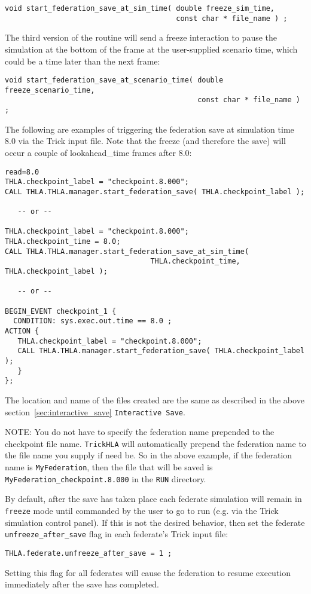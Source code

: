 \begin{verbatim}
void start_federation_save_at_sim_time( double freeze_sim_time,
                                        const char * file_name ) ;
\end{verbatim}

The third version of the routine will send a freeze interaction to pause the
simulation at the bottom of the frame at the user-supplied scenario time,
which could be a time later than the next frame:

\begin{verbatim}
void start_federation_save_at_scenario_time( double freeze_scenario_time,
                                             const char * file_name ) ;
\end{verbatim}

The following are examples of triggering the federation
save at simulation time 8.0 via the Trick input file. Note that the freeze (and therefore
the save) will occur a couple of lookahead\_time frames after 8.0:

\begin{verbatim}
read=8.0
THLA.checkpoint_label = "checkpoint.8.000";
CALL THLA.THLA.manager.start_federation_save( THLA.checkpoint_label );

   -- or --

THLA.checkpoint_label = "checkpoint.8.000";
THLA.checkpoint_time = 8.0;
CALL THLA.THLA.manager.start_federation_save_at_sim_time( 
                                  THLA.checkpoint_time, THLA.checkpoint_label );

   -- or --

BEGIN_EVENT checkpoint_1 {
  CONDITION: sys.exec.out.time == 8.0 ;
ACTION {
   THLA.checkpoint_label = "checkpoint.8.000";
   CALL THLA.THLA.manager.start_federation_save( THLA.checkpoint_label );
   }
};
\end{verbatim}

The location and name of the files created are the same as described in the above section~\ref{sec:interactive_save}
 {\tt Interactive Save}.

NOTE: You do not have to specify the federation name prepended to the checkpoint file name.
{\tt TrickHLA} will automatically prepend the federation name to the file name you supply if need be.
So in the above example, if the federation 
name is {\tt MyFederation}, then the file that will be saved is {\tt MyFederation\_checkpoint.8.000} in the {\tt RUN} directory.

By default, after the save has taken place each federate simulation will remain in {\tt freeze} mode until commanded
by the user to go to run (e.g. via the Trick simulation control panel). If this is not the desired behavior, then set the federate {\tt unfreeze\_after\_save} flag in 
each federate's Trick input file:

\begin{verbatim}
THLA.federate.unfreeze_after_save = 1 ;
\end{verbatim}

Setting this flag for all federates will cause the federation to resume execution immediately after the save has completed.

